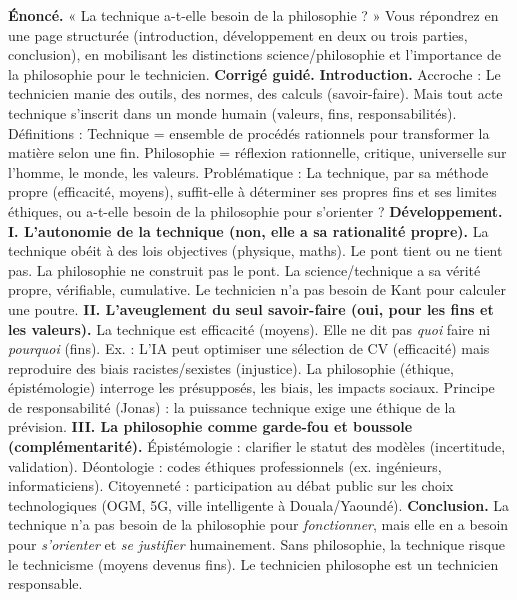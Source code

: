 \documentclass[11pt]{article}
\begin{document}
\begin{exoresolu}
\textbf{Énoncé.} « La technique a-t-elle besoin de la philosophie ? » Vous répondrez en une page structurée (introduction, développement en deux ou trois parties, conclusion), en mobilisant les distinctions science/philosophie et l'importance de la philosophie pour le technicien.
\tcblower
\textbf{Corrigé guidé.}
\textbf{Introduction.} Accroche : Le technicien manie des outils, des normes, des calculs (savoir-faire). Mais tout acte technique s'inscrit dans un monde humain (valeurs, fins, responsabilités). Définitions : Technique = ensemble de procédés rationnels pour transformer la matière selon une fin. Philosophie = réflexion rationnelle, critique, universelle sur l'homme, le monde, les valeurs. Problématique : La technique, par sa méthode propre (efficacité, moyens), suffit-elle à déterminer ses propres fins et ses limites éthiques, ou a-t-elle besoin de la philosophie pour s'orienter ?
\textbf{Développement.}
\textbf{I. L'autonomie de la technique (non, elle a sa rationalité propre).} La technique obéit à des lois objectives (physique, maths). Le pont tient ou ne tient pas. La philosophie ne construit pas le pont. La science/technique a sa vérité propre, vérifiable, cumulative. Le technicien n'a pas besoin de Kant pour calculer une poutre.
\textbf{II. L'aveuglement du seul savoir-faire (oui, pour les fins et les valeurs).} La technique est efficacité (moyens). Elle ne dit pas \emph{quoi} faire ni \emph{pourquoi} (fins). Ex. : L'IA peut optimiser une sélection de CV (efficacité) mais reproduire des biais racistes/sexistes (injustice). La philosophie (éthique, épistémologie) interroge les présupposés, les biais, les impacts sociaux. Principe de responsabilité (Jonas) : la puissance technique exige une éthique de la prévision.
\textbf{III. La philosophie comme garde-fou et boussole (complémentarité).} Épistémologie : clarifier le statut des modèles (incertitude, validation). Déontologie : codes éthiques professionnels (ex. ingénieurs, informaticiens). Citoyenneté : participation au débat public sur les choix technologiques (OGM, 5G, ville intelligente à Douala/Yaoundé).
\textbf{Conclusion.} La technique n'a pas besoin de la philosophie pour \emph{fonctionner}, mais elle en a besoin pour \emph{s'orienter} et \emph{se justifier} humainement. Sans philosophie, la technique risque le technicisme (moyens devenus fins). Le technicien philosophe est un technicien responsable.
\end{exoresolu}
\end{document}
